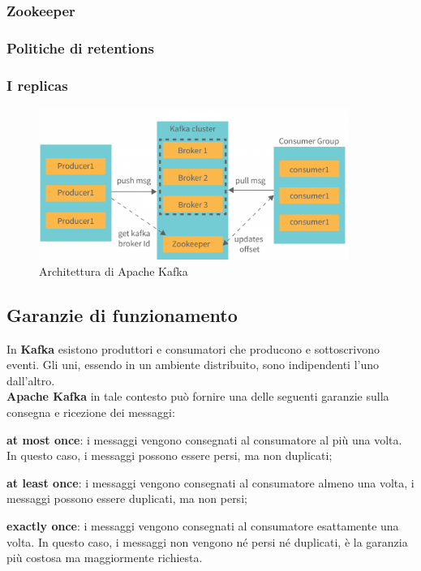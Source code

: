 \subsubsection{Zookeeper}








\subsubsection{Politiche di retentions}
\subsubsection{I replicas}

\begin{figure}[h]
    \centering
    \includegraphics[width=0.9\textwidth]{images/componenti/kafka_architetcture.png}
    \caption{Architettura di Apache Kafka}
    \label{fig:kafka_architecture}
\end{figure}

\subsection{Garanzie di funzionamento}
In \textbf{Kafka} esistono produttori e consumatori che producono e sottoscrivono eventi. Gli uni, essendo in un ambiente distribuito,
sono indipendenti l’uno dall’altro. \\
\textbf{Apache Kafka} in tale contesto può fornire una delle seguenti garanzie sulla consegna e ricezione dei messaggi:
\begin{list}{*}
    \item \textbf{at most once}: i messaggi vengono consegnati al consumatore al più una volta. In questo caso, i messaggi possono essere persi, ma non duplicati;
   \item \item  \textbf{at least once}: i messaggi vengono consegnati al consumatore almeno una volta, i messaggi possono essere duplicati, ma non persi;
    \item \textbf{exactly once}: i messaggi vengono consegnati al consumatore esattamente una volta. In questo caso, i messaggi non vengono né persi né duplicati, è la garanzia più costosa ma maggiormente richiesta.
\end{list}


